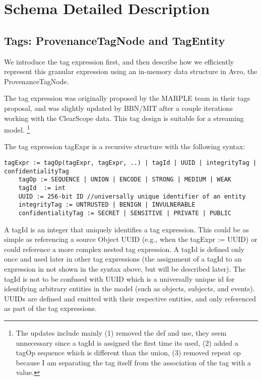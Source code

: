 \section{Schema Detailed Description}
\subsection{Tags: ProvenanceTagNode and TagEntity}\label{sec:provenancetag}

We introduce the tag expression first, and then describe how we efficiently represent this granular expression using an in-memory data structure in Avro, the {\sf ProvenanceTagNode}.

The tag expression was originally proposed by the MARPLE team in their tags proposal,
and was slightly updated by BBN/MIT after a couple iterations working with the ClearScope data.
This tag design is suitable for a streaming model.
\footnote{The updates include mainly (1) removed the def and use, they seem unnecessary since a tagId is assigned the first time its used, (2) added a tagOp {\sf sequence} which is different than the union, (3) removed repeat op because I am separating the tag itself from the association of the tag with a value.}

The tag expression {\sf tagExpr} is a recursive structure with the following syntax:
\begin{Verbatim}[fontsize=\small]
 tagExpr := tagOp(tagExpr, tagExpr, ..) | tagId | UUID | integrityTag | confidentialityTag   
    tagOp := SEQUENCE | UNION | ENCODE | STRONG | MEDIUM | WEAK
    tagId  := int
    UUID := 256-bit ID //universally unique identifier of an entity 
    integrityTag := UNTRUSTED | BENIGN | INVULNERABLE
    confidentialityTag := SECRET | SENSITIVE | PRIVATE | PUBLIC
\end{Verbatim}

A {\sf tagId} is an integer that uniquely identifies a tag expression. This could be as simple as referencing a source Object UUID (e.g., when the tagExpr := UUID) or could reference a more complex nested tag expression. A tagId is defined only once and used later in other tag expressions (the assignment of a tagId to an expression in not shown in the syntax above, but will be described later).
The tagId is not to be confused with {\sf UUID} which is a universally unique id for identifying arbitrary entities in the model (such as objects, subjects, and events). UUIDs are defined and emitted with their respective entities, and only referenced as part of the tag expressions.

